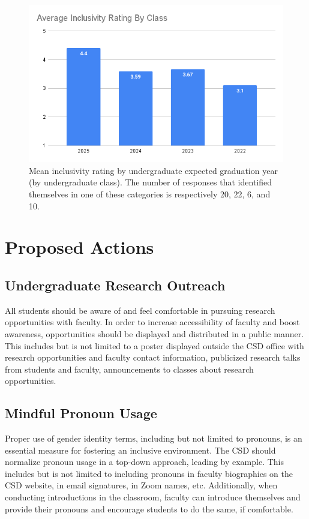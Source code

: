 \documentclass{article}
\begin{document}
\begin{figure}[h]
\label{class}
\includegraphics[width=\textwidth]{class.png}
\caption{Mean inclusivity rating by undergraduate expected graduation year (by undergraduate class).
The number of responses that identified themselves in 
one of these categories is respectively 20, 22, 6, and 10.}
\end{figure}


\section{Proposed Actions}\label{proposed actions}

\subsection{Undergraduate Research Outreach} 
All students should be aware of and feel comfortable in pursuing 
research opportunities with faculty. In order to increase accessibility of faculty and boost awareness, 
opportunities should be displayed and distributed in a public manner. This includes but is not limited to a poster 
displayed outside the CSD office with research opportunities and faculty contact information, publicized research 
talks from students and faculty, announcements to classes about research opportunities.

\subsection{Mindful Pronoun Usage} 
Proper use of gender identity terms, including but not limited to pronouns, 
is an essential measure for fostering an inclusive environment. The CSD should normalize pronoun usage in a 
top-down approach, leading by example. This includes but is not limited to including pronouns in faculty biographies 
on the CSD website, in email signatures, in Zoom names, etc. Additionally, when conducting introductions in the 
classroom, faculty can introduce themselves and provide their pronouns and encourage students to do the same, if 
comfortable.
\end{document}
